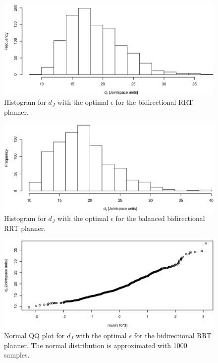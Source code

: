 \begin{figure}[h]
 \centering
 \includegraphics[width=\figsize]{graphics/hist_op_bi}
 \caption{Histogram for \(d_J\) with the optimal \(\epsilon\) for the bidirectional RRT planner.}
 \label{fig:bidir_histogram}
\end{figure}

\begin{figure}[h]
 \centering
 \includegraphics[width=\figsize]{graphics/hist_op_ba}
 \caption{Histogram for \(d_J\) with the optimal \(\epsilon\) for the balanced bidirectional RRT planner.}
 \label{fig:balanced_histogram}
\end{figure}

\begin{figure}[h]
 \centering
 \includegraphics[width=\figsize]{graphics/qq_op_bi}
 \caption{Normal QQ plot for \(d_J\) with the optimal \(\epsilon\) for the bidirectional RRT planner. The normal distribution is approximated with 1000 samples.}
 \label{fig:bidir_qq}
\end{figure}

